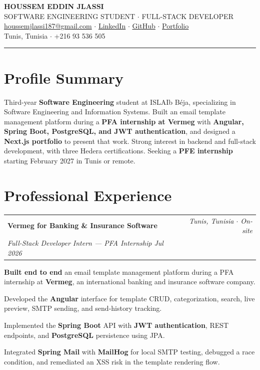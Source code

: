 \documentclass[a4paper,10pt]{article}
\makeatletter
\newcommand{\entry}[3]{%
  \noindent
  \begin{tabularx}{\linewidth}{@{}X r@{}}
    \textbf{#1} & \textcolor{muted}{\textit{#2}}\\
    \textcolor{muted}{\textit{#3}} &
  \end{tabularx}
  \vspace{1pt}
}
\makeatother
\begin{document}
\begin{center}
  {\fontsize{21}{23}\selectfont\bfseries HOUSSEM EDDIN JLASSI}\\[3pt]
  {\small\color{muted}
    SOFTWARE ENGINEERING STUDENT $\cdot$ FULL-STACK DEVELOPER}\\[5pt]
  {\small
    \href{mailto:houssemjlassi187@gmail.com}{houssemjlassi187@gmail.com}
    $\cdot$ \href{https://www.linkedin.com/in/houssem-eddin-jlassi-824a8742b}{LinkedIn}
    $\cdot$ \href{https://github.com/houssemjl01}{GitHub}
    $\cdot$ \href{https://houssem-portfolio-gray.vercel.app}{Portfolio}}\\[2pt]
  {\small\color{muted}
    Tunis, Tunisia $\cdot$ +216 93 536 505}
\end{center}

\vspace{-3pt}
\rule{\linewidth}{1pt}

\section*{Profile Summary}
Third-year \textbf{Software Engineering} student at ISLAIb Béja, specializing in Software Engineering and Information Systems. Built an email template management platform during a \textbf{PFA internship at Vermeg} with \textbf{Angular, Spring Boot, PostgreSQL, and JWT authentication}, and designed a \textbf{Next.js portfolio} to present that work. Strong interest in backend and full-stack development, with three Hedera certifications. Seeking a \textbf{PFE internship} starting February 2027 in Tunis or remote.

\section*{Professional Experience}

\entry{Vermeg for Banking \& Insurance Software}
      {Tunis, Tunisia $\cdot$ On-site}
      {Full-Stack Developer Intern --- PFA Internship \hfill Jul 2026}

\begin{cvitems}
  \item \textbf{Built end to end} an email template management platform during a PFA internship at \textbf{Vermeg}, an international banking and insurance software company.
  \item Developed the \textbf{Angular} interface for template CRUD, categorization, search, live preview, SMTP sending, and send-history tracking.
  \item Implemented the \textbf{Spring Boot} API with \textbf{JWT authentication}, REST endpoints, and \textbf{PostgreSQL} persistence using JPA.
  \item Integrated \textbf{Spring Mail} with \textbf{MailHog} for local SMTP testing, debugged a race condition, and remediated an XSS risk in the template rendering flow.
\end{cvitems}
\end{document}

